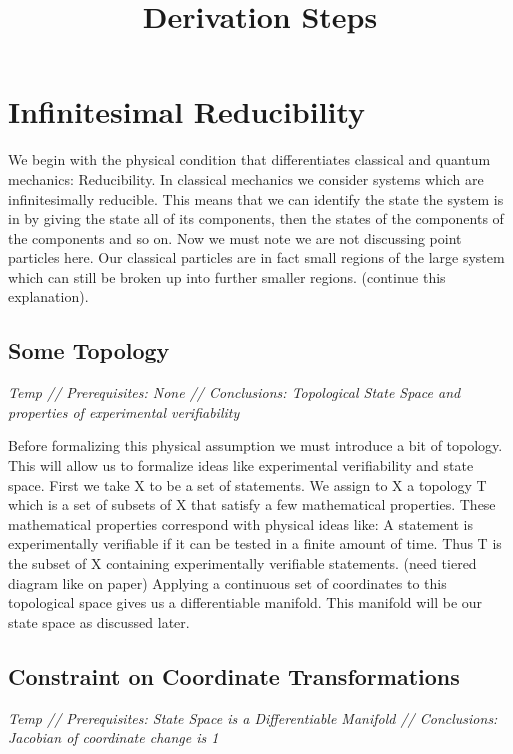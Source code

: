 \documentclass{article}
\begin{document}
\title{Derivation Steps}

\section{Infinitesimal Reducibility}

	We begin with the physical condition that differentiates classical and quantum mechanics: Reducibility. In classical mechanics we consider systems which are infinitesimally reducible. This means that we can identify the state the system is in by giving the state all of its components, then the states of the components of the components and so on. Now we must note we are not discussing point particles here. Our classical particles are in fact small regions of the large system which can still be broken up into further smaller regions. (continue this explanation). 
	
\subsection{Some Topology}
\textsl{Temp // Prerequisites: None // Conclusions: Topological State Space and properties of experimental verifiability}

	Before formalizing this physical assumption we must introduce a bit of topology. This will allow us to formalize ideas like experimental verifiability and state space. First we take X to be a set of statements. We assign to X a topology T which is a set of subsets of X that satisfy a few mathematical properties. These mathematical properties correspond with physical ideas like: A statement is experimentally verifiable if it can be tested in a finite amount of time. Thus T is the subset of X containing experimentally verifiable statements. (need tiered diagram like on paper) Applying a continuous set of coordinates to this topological space gives us a differentiable manifold. This manifold will be our state space as discussed later.
	
\subsection{Constraint on Coordinate Transformations}
\textsl{Temp // Prerequisites: State Space is a Differentiable Manifold // Conclusions: Jacobian of coordinate change is 1}
\end{document}

